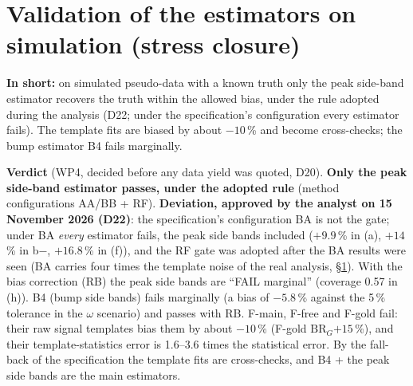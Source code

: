 \documentclass[11pt,a4paper]{article}
\newcommand{\BRG}{\ensuremath{\mathrm{BR}_G}\xspace}
\newcommand{\notebox}[1]{\par\noindent\colorbox{orange!10}{\parbox{\dimexpr\linewidth-2\fboxsep\relax}{#1}}\par}
\newcommand{\tipbox}[1]{\par\noindent\colorbox{blue!6}{\parbox{\dimexpr\linewidth-2\fboxsep\relax}{#1}}\par}
\newcommand{\inshort}[1]{\tipbox{\textbf{In short:} #1}}%
\begin{document}
\section{Validation of the estimators on simulation (stress closure)}
\label{sec:val}
\inshort{on simulated pseudo-data with a known truth only the peak side-band estimator recovers the truth within the allowed bias, under the rule adopted during the analysis (D22; under the specification's configuration every estimator fails). The template fits are biased by about $-10$\,\% and become cross-checks; the bump estimator B4 fails marginally.}
\notebox{\textbf{Verdict} (WP4, decided before any data yield was quoted, D20). \textbf{Only the peak side-band estimator passes, under the
adopted rule} (method configurations AA/BB + RF). \textbf{Deviation, approved by the analyst on 15 November 2026 (D22)}: the specification's configuration BA is not the
gate; under BA \emph{every} estimator fails, the peak side bands included ($+9.9$\,\% in (a), $+14$\,\% in b$-$, $+16.8$\,\% in (f)), and the
RF gate was adopted after the BA results were seen (BA carries four times the template noise of the real analysis, \S\ref{sec:val}). With the
bias correction (RB) the peak side bands are ``FAIL marginal'' (coverage 0.57 in (h)). B4 (bump side bands) fails marginally (a bias of
$-5.8$\,\% against the 5\,\% tolerance in the $\omega$ scenario) and passes with RB. F-main, F-free and F-gold fail: their raw signal templates
bias them by about $-10$\,\% (F-gold \BRG $+15$\,\%), and their template-statistics error is 1.6--3.6 times the statistical error. By the
fall-back of the specification the template fits are cross-checks, and B4 + the peak side bands are the main estimators.}
\end{document}
